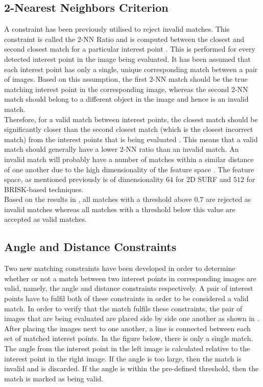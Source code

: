 \documentclass[11pt]{report}
\begin{document}
\subsection{2-Nearest Neighbors Criterion}
\label{sec:2nnMatching}
A constraint has been previously utilised to reject invalid matches. This constraint is called the 2-NN Ratio and is computed between the closest and second closest match for a particular interest point \cite{Lowe2004}. This is performed for every detected interest point in the image being evaluated. It has been assumed that each interest point has only a single, unique corresponding match between a pair of images. Based on this assumption, the first 2-NN match should be the true matching interest point in the corresponding image, whereas the second 2-NN match should belong to a different object in the image and hence is an invalid match.\\

Therefore, for a valid match between interest points, the closest match should be significantly closer than the second closest match (which is the closest incorrect match) from the interest points that is being evaluated \cite{Lowe2004}. This means that a valid match should generally have a lower 2-NN ratio than an invalid match. An invalid match will probably have a number of matches within a similar distance of one another due to the high dimensionality of the feature space \cite{Lowe2004}. The feature space, as mentioned previously is of dimensionality $64$ for 2D SURF and $512$ for BRISK-based techniques.\\

Based on the results in , all matches with a threshold above $0.7$ are rejected as invalid matches whereas all matches with a threshold below this value are accepted as valid matches.\\



\subsection{Angle and Distance Constraints}
\label{sec:angleDistanceConstraints}
Two new matching constraints have been developed in order to determine whether or not a match between two interest points in corresponding images are valid, namely, the angle and distance constraints respectively. A pair of interest points have to fulfil both of these constraints in order to be considered a valid match. In order to verify that the match fulfils these constraints, the pair of images that are being evaluated are placed side by side one another as shown in . After placing the images next to one another, a line is connected between each set of matched interest points. In the figure below, there is only a single match. The angle from the interest point in the left image is calculated relative to the interest point in the right image. If the angle is too large, then the match is invalid and is discarded. If the angle is within the pre-defined threshold, then the match is marked as being valid.\\
\end{document}
